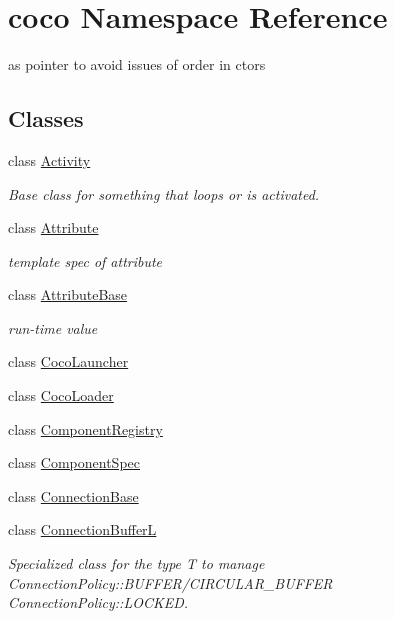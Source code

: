 \hypertarget{namespacecoco}{}\section{coco Namespace Reference}
\label{namespacecoco}


as pointer to avoid issues of order in ctors  


\subsection*{Classes}
\begin{DoxyCompactItemize}
\item 
class \hyperlink{classcoco_1_1_activity}{Activity}
\begin{DoxyCompactList}\small\item\em Base class for something that loops or is activated. \end{DoxyCompactList}\item 
class \hyperlink{classcoco_1_1_attribute}{Attribute}
\begin{DoxyCompactList}\small\item\em template spec of attribute \end{DoxyCompactList}\item 
class \hyperlink{classcoco_1_1_attribute_base}{Attribute\+Base}
\begin{DoxyCompactList}\small\item\em run-\/time value \end{DoxyCompactList}\item 
class \hyperlink{classcoco_1_1_coco_launcher}{Coco\+Launcher}
\item 
class \hyperlink{classcoco_1_1_coco_loader}{Coco\+Loader}
\item 
class \hyperlink{classcoco_1_1_component_registry}{Component\+Registry}
\item 
class \hyperlink{classcoco_1_1_component_spec}{Component\+Spec}
\item 
class \hyperlink{classcoco_1_1_connection_base}{Connection\+Base}
\item 
class \hyperlink{classcoco_1_1_connection_buffer_l}{Connection\+Buffer\+L}
\begin{DoxyCompactList}\small\item\em Specialized class for the type T to manage Connection\+Policy\+::\+B\+U\+F\+F\+E\+R/\+C\+I\+R\+C\+U\+L\+A\+R\+\_\+\+B\+U\+F\+F\+E\+R Connection\+Policy\+::\+L\+O\+C\+K\+E\+D. \end{DoxyCompactList}\item 

\end{DoxyCompactItemize}
